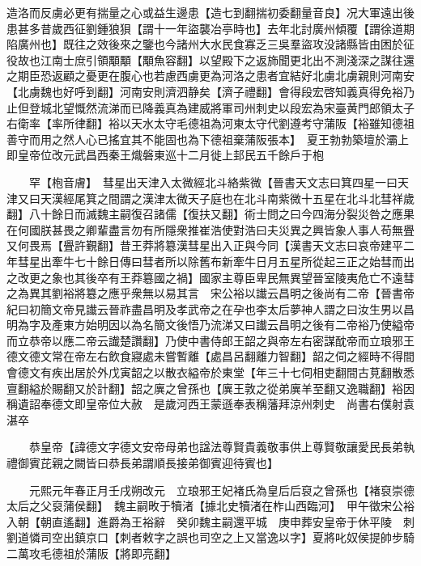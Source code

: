 造洛而反虜必更有揣量之心或益生邊患【造七到翻揣初委翻量音良】况大軍遠出後患甚多昔歲西征劉鍾狼狽【謂十一年盜襲冶亭時也】去年北討廣州傾覆【謂徐道期陷廣州也】既往之效後來之鑒也今諸州大水民食寡乏三吳羣盜攻没諸縣皆由困於征役故也江南士庶引領顒顒【顒魚容翻】以望殿下之返斾聞更北出不測淺深之謀往還之期臣恐返顧之憂更在腹心也若慮西虜更為河洛之患者宜結好北虜北虜親則河南安【北虜魏也好呼到翻】河南安則濟泗静矣【濟子禮翻】會得段宏啓知義真得免裕乃止但登城北望慨然流涕而已降義真為建威將軍司州刺史以段宏為宋臺黄門郎領太子右衛率【率所律翻】裕以天水太守毛德祖為河東太守代劉遵考守蒲阪【裕雖知德祖善守而用之然人心已搖宜其不能固也為下德祖棄蒲阪張本】　夏王勃勃築壇於灞上即皇帝位改元武昌西秦王熾磐東巡十二月徙上邽民五千餘戶于枹

　　罕【枹音膚】　彗星出天津入太微經北斗絡紫微【晉書天文志曰箕四星一曰天津又曰天漢經尾箕之間謂之漢津太微天子庭也在北斗南紫微十五星在北斗北彗祥歲翻】八十餘日而滅魏主嗣復召諸儒【復扶又翻】術士問之曰今四海分裂災咎之應果在何國朕甚畏之卿輩盡言勿有所隱衆推崔浩使對浩曰夫災異之興皆象人事人苟無舋又何畏焉【舋許覲翻】昔王莽將簒漢彗星出入正與今同【漢書天文志曰哀帝建平二年彗星出牽牛七十餘日傳曰彗者所以除舊布新牽牛日月五星所從起三正之始彗而出之改更之象也其後卒有王莽簒國之禍】國家主尊臣卑民無異望晉室陵夷危亡不遠彗之為異其劉裕將簒之應乎衆無以易其言　宋公裕以䜟云昌明之後尚有二帝【晉書帝紀曰初簡文帝見䜟云晉祚盡昌明及孝武帝之在孕也李太后夢神人謂之曰汝生男以昌明為字及產東方始明因以為名簡文後悟乃流涕又曰䜟云昌明之後有二帝裕乃使縊帝而立恭帝以應二帝云䜟楚讚翻】乃使中書侍郎王韶之與帝左右密謀酖帝而立琅邪王德文德文常在帝左右飲食寢處未嘗暫離【處昌呂翻離力智翻】韶之伺之經時不得間會德文有疾出居於外戊寅韶之以散衣縊帝於東堂【年三十七伺相吏翻間古莧翻散悉亶翻縊於賜翻又於計翻】韶之廙之曾孫也【廙王敦之從弟廙羊至翻又逸職翻】裕因稱遺詔奉德文即皇帝位大赦　是歲河西王蒙遜奉表稱藩拜涼州刺史　尚書右僕射袁湛卒

　　恭皇帝【諱德文字德文安帝母弟也諡法尊賢貴義敬事供上尊賢敬讓愛民長弟執禮御賓芘親之闕皆曰恭長弟謂順長接弟御賓迎待賓也】

　　元熙元年春正月壬戌朔改元　立琅邪王妃褚氏為皇后后裒之曾孫也【褚裒崇德太后之父裒蒲侯翻】　魏主嗣畋于犢渚【據北史犢渚在柞山西臨河】　甲午徵宋公裕入朝【朝直遙翻】進爵為王裕辭　癸卯魏主嗣還平城　庚申葬安皇帝于休平陵　刺劉道憐司空出鎮京口【刺者敕字之誤也司空之上又當逸以字】夏將叱奴侯提帥步騎二萬攻毛德祖於蒲阪【將即亮翻】

